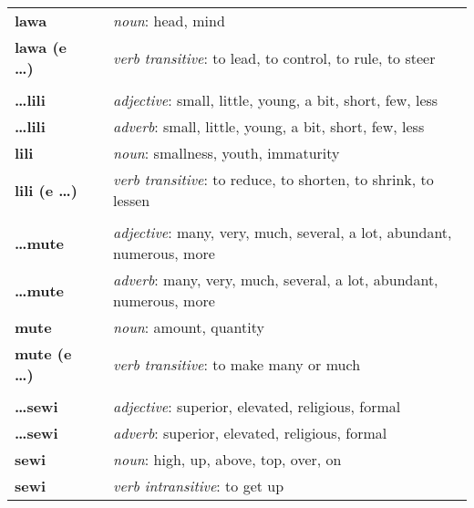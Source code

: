 \begin{supertabular}{p{2,5cm}|ll}
    \textbf{lawa}            &  & \textit{noun}: head, mind                                                      \\
    \textbf{lawa (e \dots)}  &  & \textit{verb transitive}: to lead, to control, to rule, to steer               \\
                             &  &                                                                                \\
    \textbf{\dots lili}      &  & \textit{adjective}: small, little, young, a bit, short, few, less              \\
    \textbf{\dots lili}      &  & \textit{adverb}: small, little, young, a bit, short, few, less                 \\
    \textbf{lili}            &  & \textit{noun}: smallness, youth, immaturity                                    \\
    \textbf{lili (e \dots)}  &  & \textit{verb transitive}: to reduce, to shorten, to shrink, to lessen          \\
                             &  &                                                                                \\
    \textbf{\dots mute}      &  & \textit{adjective}: many, very, much, several, a lot, abundant, numerous, more \\
    \textbf{\dots mute}      &  & \textit{adverb}: many, very, much, several, a lot, abundant, numerous, more    \\
    \textbf{mute}            &  & \textit{noun}: amount, quantity                                                \\
    \textbf{mute (e \dots)}  &  & \textit{verb transitive}: to make many or much                                 \\
                             &  &                                                                                \\
    \textbf{\dots sewi}      &  & \textit{adjective}: superior, elevated, religious, formal                      \\
    \textbf{\dots sewi}      &  & \textit{adverb}: superior, elevated, religious, formal                         \\
    \textbf{sewi}            &  & \textit{noun}: high, up, above, top, over, on                                  \\
    \textbf{sewi}            &  & \textit{verb intransitive}: to get up                                          \\

\end{supertabular}

